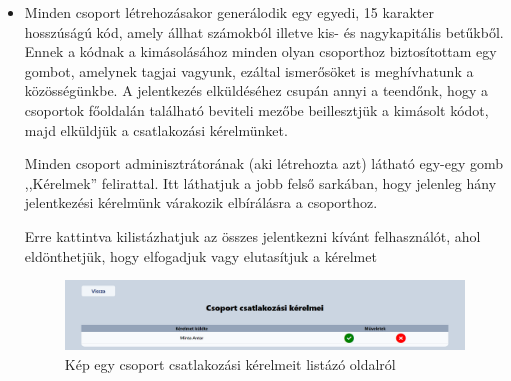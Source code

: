 \documentclass[
]{thesis-ekf}
\theoremstyle{definition}
\theoremstyle{remark}
\begin{document}
                \begin{itemize}
                    \item Minden csoport létrehozásakor generálodik egy egyedi, 15 karakter hosszúságú kód, amely állhat számokból illetve kis- és nagykapitális betűkből. Ennek a kódnak a kimásolásához minden olyan csoporthoz biztosítottam egy gombot, amelynek tagjai vagyunk, ezáltal ismerősöket is meghívhatunk a közösségünkbe. A jelentkezés elküldéséhez csupán annyi a teendőnk, hogy a csoportok főoldalán található beviteli mezőbe beillesztjük a kimásolt kódot, majd elküldjük a csatlakozási kérelmünket. 

                    Minden csoport adminisztrátorának (aki létrehozta azt) látható egy-egy gomb ,,Kérelmek'' felirattal. Itt láthatjuk a jobb felső sarkában, hogy jelenleg hány jelentkezési kérelmünk várakozik elbírálásra a csoporthoz.

                    Erre kattintva kilistázhatjuk az összes jelentkezni kívánt felhasználót, ahol eldönthetjük, hogy elfogadjuk vagy elutasítjuk a kérelmet

                    \begin{figure}[ht!]
    		        \centering
    		        \includegraphics[width=15cm]{Groups.join.requests.png}
                        \caption{Kép egy csoport csatlakozási kérelmeit listázó oldalról}
    		        \label{fig-groups-joinrequests}
    	        \end{figure}


\end{itemize}
\end{document}
